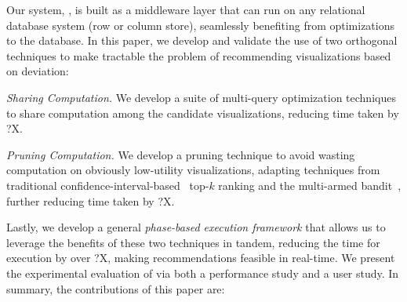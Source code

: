 Our system, \SeeDB, is built as a middleware layer that can run on any 
relational database system (row or column store), 
seamlessly benefiting from optimizations to 
the database. 
In this paper, we develop and validate the use of  
two orthogonal techniques to make tractable the problem
of recommending visualizations based on deviation:
\begin{denselist}
\item {\em Sharing Computation.} 
We develop a suite of multi-query optimization techniques to share computation
among the candidate visualizations,
reducing time taken by ?X. 
\item {\em Pruning Computation.}
We develop a pruning technique to avoid wasting computation
on obviously low-utility visualizations, adapting
techniques from traditional 
  confidence-interval-based~\cite{hoeffding1963probability} 
  top-$k$ ranking and the
  multi-armed bandit~\cite{bandits},
  further reducing time taken by ?X. 
\end{denselist}
Lastly, we develop a general {\em phase-based execution framework}
that allows us to leverage the benefits of these two techniques
in tandem, reducing the time for execution by over ?X,
making recommendations feasible in real-time. 
We present the experimental evaluation of \SeeDB 
via both a performance study and a user study.
In summary, the contributions of this paper are:


